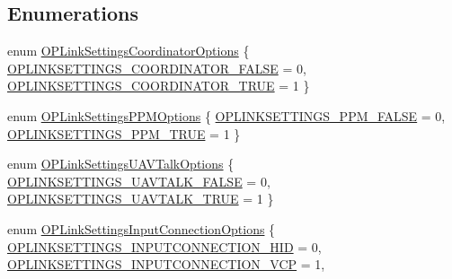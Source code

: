 \subsection*{\-Enumerations}
\begin{DoxyCompactItemize}
\item 
enum \hyperlink{group___o_p_link_settings_gafcb1fe962fa4807584ed48a69bcc1943}{\-O\-P\-Link\-Settings\-Coordinator\-Options} \{ \hyperlink{group___o_p_link_settings_ggafcb1fe962fa4807584ed48a69bcc1943acbfad61724fde2d26dc8b6fec54b6bb7}{\-O\-P\-L\-I\-N\-K\-S\-E\-T\-T\-I\-N\-G\-S\-\_\-\-C\-O\-O\-R\-D\-I\-N\-A\-T\-O\-R\-\_\-\-F\-A\-L\-S\-E} = 0, 
\hyperlink{group___o_p_link_settings_ggafcb1fe962fa4807584ed48a69bcc1943a9dd68e9c72cb7465b388d0b3a8ea767c}{\-O\-P\-L\-I\-N\-K\-S\-E\-T\-T\-I\-N\-G\-S\-\_\-\-C\-O\-O\-R\-D\-I\-N\-A\-T\-O\-R\-\_\-\-T\-R\-U\-E} = 1
 \}
\item 
enum \hyperlink{group___o_p_link_settings_gaf2203c11da9c0a8bff249c37d266478f}{\-O\-P\-Link\-Settings\-P\-P\-M\-Options} \{ \hyperlink{group___o_p_link_settings_ggaf2203c11da9c0a8bff249c37d266478fa53d1e059cdd5de9765e49ad12bf920b1}{\-O\-P\-L\-I\-N\-K\-S\-E\-T\-T\-I\-N\-G\-S\-\_\-\-P\-P\-M\-\_\-\-F\-A\-L\-S\-E} = 0, 
\hyperlink{group___o_p_link_settings_ggaf2203c11da9c0a8bff249c37d266478faacfb0095443940db176ab03147b05c4a}{\-O\-P\-L\-I\-N\-K\-S\-E\-T\-T\-I\-N\-G\-S\-\_\-\-P\-P\-M\-\_\-\-T\-R\-U\-E} = 1
 \}
\item 
enum \hyperlink{group___o_p_link_settings_ga781104585ae992b45618772c6b4a1dd5}{\-O\-P\-Link\-Settings\-U\-A\-V\-Talk\-Options} \{ \hyperlink{group___o_p_link_settings_gga781104585ae992b45618772c6b4a1dd5a16218232db9f885037f7e000318b42b5}{\-O\-P\-L\-I\-N\-K\-S\-E\-T\-T\-I\-N\-G\-S\-\_\-\-U\-A\-V\-T\-A\-L\-K\-\_\-\-F\-A\-L\-S\-E} = 0, 
\hyperlink{group___o_p_link_settings_gga781104585ae992b45618772c6b4a1dd5a60a600a4d942b8fa447f4aa7bdd3b964}{\-O\-P\-L\-I\-N\-K\-S\-E\-T\-T\-I\-N\-G\-S\-\_\-\-U\-A\-V\-T\-A\-L\-K\-\_\-\-T\-R\-U\-E} = 1
 \}
\item 
enum \hyperlink{group___o_p_link_settings_ga0253fc9e036d3f90c4acf29c7e4530c6}{\-O\-P\-Link\-Settings\-Input\-Connection\-Options} \{ \hyperlink{group___o_p_link_settings_gga0253fc9e036d3f90c4acf29c7e4530c6a0dfed0a852f242f8aa291dd58c61bff5}{\-O\-P\-L\-I\-N\-K\-S\-E\-T\-T\-I\-N\-G\-S\-\_\-\-I\-N\-P\-U\-T\-C\-O\-N\-N\-E\-C\-T\-I\-O\-N\-\_\-\-H\-I\-D} = 0, 
\hyperlink{group___o_p_link_settings_gga0253fc9e036d3f90c4acf29c7e4530c6a6a188746136d7d385fff7184906f78b8}{\-O\-P\-L\-I\-N\-K\-S\-E\-T\-T\-I\-N\-G\-S\-\_\-\-I\-N\-P\-U\-T\-C\-O\-N\-N\-E\-C\-T\-I\-O\-N\-\_\-\-V\-C\-P} = 1, 

\end{DoxyCompactItemize}

